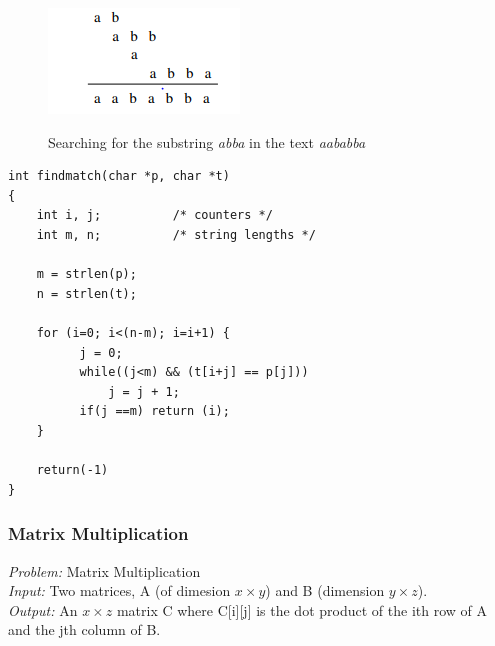 \begin{figure}[H]
  \centering
     \includegraphics[scale=0.6]{./2_6.png}
  \label{fig:demo-diagram}
  \caption{Searching for the substring \emph{abba} in the text \emph{aababba}}
\end{figure}

\begin{verbatim}
int findmatch(char *p, char *t)
{
    int i, j;          /* counters */
    int m, n;          /* string lengths */

    m = strlen(p);
    n = strlen(t);

    for (i=0; i<(n-m); i=i+1) {
          j = 0;
          while((j<m) && (t[i+j] == p[j]))
              j = j + 1;
          if(j ==m) return (i);
    }

    return(-1)
}
\end{verbatim}


\subsubsection{Matrix Multiplication}

\emph{Problem:} Matrix Multiplication\\
\emph{Input:} Two matrices, A (of dimesion  $x \times y$) and B (dimension $y \times z$).\\
\emph{Output:} An $x \times z$ matrix C where C[i][j] is the dot product of the ith row of A and the jth column of B.\\
